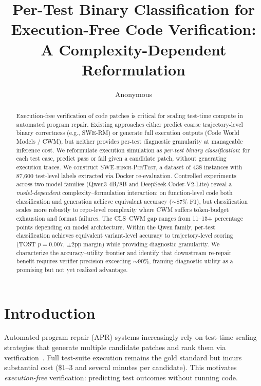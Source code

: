 \documentclass[11pt]{article}
\title{Per-Test Binary Classification for Execution-Free Code Verification:\\A Complexity-Dependent Reformulation}
\author{Anonymous}
\date{}
\begin{document}
\maketitle

\begin{abstract}
Execution-free verification of code patches is critical for scaling test-time compute in automated program repair. Existing approaches either predict coarse trajectory-level binary correctness (e.g., SWE-RM) or generate full execution outputs (Code World Models / CWM), but neither provides per-test diagnostic granularity at manageable inference cost. We reformulate execution simulation as \emph{per-test binary classification}: for each test case, predict pass or fail given a candidate patch, without generating execution traces. We construct \textsc{SWE-bench-PerTest}, a dataset of 438 instances with 87,600 test-level labels extracted via Docker re-evaluation. Controlled experiments across two model families (Qwen3 4B/8B and DeepSeek-Coder-V2-Lite) reveal a \emph{model-dependent} complexity--formulation interaction: on function-level code both classification and generation achieve equivalent accuracy ($\sim$87\% F1), but classification scales more robustly to repo-level complexity where CWM suffers token-budget exhaustion and format failures. The CLS--CWM gap ranges from 11--15+ percentage points depending on model architecture. Within the Qwen family, per-test classification achieves equivalent variant-level accuracy to trajectory-level scoring (TOST $p=0.007$, $\pm$2pp margin) while providing diagnostic granularity. We characterize the accuracy--utility frontier and identify that downstream re-repair benefit requires verifier precision exceeding $\sim$90\%, framing diagnostic utility as a promising but not yet realized advantage.
\end{abstract}

\section{Introduction}
\label{sec:intro}

Automated program repair (APR) systems increasingly rely on test-time scaling strategies that generate multiple candidate patches and rank them via verification~\citep{jimenez2024swebench,zhang2024autocoderover}. Full test-suite execution remains the gold standard but incurs substantial cost (\$1--3 and several minutes per candidate). This motivates \emph{execution-free} verification: predicting test outcomes without running code.
\end{document}
